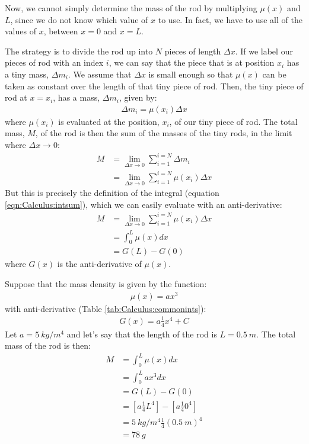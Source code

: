 
Now, we cannot simply determine the mass of the rod by multiplying $\mu(x)$ and $L$, since we do not know which value of $x$ to use. In fact, we have to use all of the values of $x$, between $x=0$ and $x=L$. 

The strategy is to divide the rod up into $N$ pieces of length $\Delta x$. If we label our pieces of rod with an index $i$, we can say that the piece that is at position $x_i$ has a tiny mass, $\Delta m_i$. We assume that $\Delta x$ is small enough so that $\mu(x)$ can be taken as constant over the length of that tiny piece of rod. Then, the tiny piece of rod at $x=x_i$, has a mass, $\Delta m_i$, given by:
\begin{align*}
\Delta m_i = \mu(x_i) \Delta x
\end{align*}
where $\mu(x_i)$ is evaluated at the position, $x_i$, of our tiny piece of rod. The total mass, $M$, of the rod is then the sum of the masses of the tiny rods, in the limit where $\Delta x\to 0$:
\begin{align*}
M &= \lim_{\Delta x\to 0}\sum_{i=1}^{i=N}\Delta m_i \\
  &= \lim_{\Delta x\to 0}\sum_{i=1}^{i=N} \mu(x_i) \Delta x
\end{align*}
But this is precisely the definition of the integral (equation \ref{eqn:Calculus:intsum}), which we can easily evaluate with an anti-derivative:
\begin{align*}
M &=\lim_{\Delta x\to 0}\sum_{i=1}^{i=N} \mu(x_i) \Delta x \\
  &= \int_0^L \mu(x) dx \\
  &= G(L) - G(0)
\end{align*}
where $G(x)$ is the anti-derivative of $\mu(x)$.

Suppose that the mass density is given by the function:
\begin{align*}
\mu(x)=ax^3
\end{align*}
with anti-derivative (Table \ref{tab:Calculus:commonints}):
\begin{align*}
G(x)=a\frac{1}{4}x^4 + C
\end{align*}
Let $a=\SI{5}{kg/m^4}$ and let's say that the length of the rod is $L=\SI{0.5}{m}$. The total mass of the rod is then:
\begin{align*}
M&=\int_0^L \mu(x) dx \\
&=\int_0^L ax^3 dx \\
&= G(L)-G(0)\\
&=\left[ a\frac{1}{4}L^4 \right] - \left[ a\frac{1}{4}0^4 \right]\\
&=\SI{5}{kg/m^4}\frac{1}{4}(\SI{0.5}{m})^4 \\
&=\SI{78}{g}\\
\end{align*}

